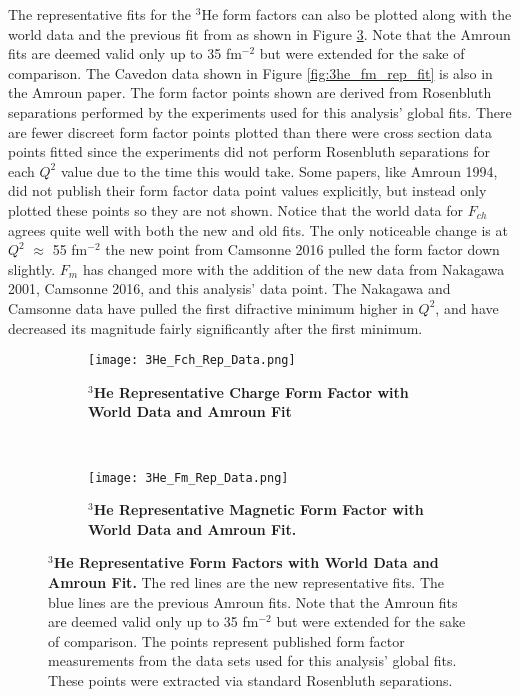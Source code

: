The representative fits for the $^3$He form factors can also be plotted along with the world data and the previous fit from \cite{Article:Amroun} as shown in Figure \ref{fig:3he_rep_data}. Note that the Amroun fits are deemed valid only up to 35 fm$^{-2}$ but were extended for the sake of comparison. The Cavedon data \cite{Article:Cavedon} shown in Figure \ref{fig:3he_fm_rep_fit} is also in the Amroun paper. The form factor points shown are derived from Rosenbluth separations performed by the experiments used for this analysis' global fits. There are fewer discreet form factor points plotted than there were cross section data points fitted since the experiments did not perform Rosenbluth separations for each $Q^2$ value due to the time this would take. Some papers, like Amroun 1994, did not publish their form factor data point values explicitly, but instead only plotted these points so they are not shown. Notice that the world data for $F_{ch}$ agrees quite well with both the new and old fits. The only noticeable change is at $Q^2$ $\approx$ 55 fm$^{-2}$ the new point from Camsonne 2016 pulled the form factor down slightly. $F_m$ has changed more with the addition of the new data from Nakagawa 2001, Camsonne 2016, and this analysis' data point. The Nakagawa and Camsonne data have pulled the first difractive minimum higher in $Q^2$, and have decreased its magnitude fairly significantly after the first minimum.

 \begin{figure}[!ht]
\begin{subfigure}{1.\textwidth}
  \centering
  \texttt{[image: 3He\_Fch\_Rep\_Data.png]}
  \caption{\bf{$^3$He Representative Charge Form Factor with World Data and Amroun Fit}}
  \label{fig:3he_fch_rep_data}
\end{subfigure}\\
\begin{subfigure}{1.\textwidth}
  \centering
  \texttt{[image: 3He\_Fm\_Rep\_Data.png]}
  \caption{\bf{$^3$He Representative Magnetic Form Factor with World Data and Amroun Fit.}}
  \label{fig:3he_fm_rep_data}
\end{subfigure}
\caption[$^3$He Representative Form Factors with World Data and Amroun Fit] {
{\bf{$^3$He Representative Form Factors with World Data and Amroun Fit.}} The red lines are the new representative fits. The blue lines are the previous Amroun fits. Note that the Amroun fits are deemed valid only up to 35 fm$^{-2}$ but were extended for the sake of comparison. The points represent published form factor measurements from the data sets used for this analysis' global fits. These points were extracted via standard Rosenbluth separations.}
\label{fig:3he_rep_data}
\end{figure}


